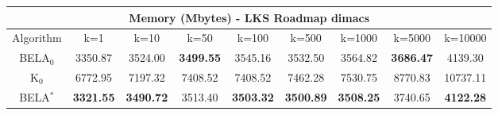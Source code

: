 \begin{tabular}{c|cccccccc}\toprule
\multicolumn{9}{c}{Memory (Mbytes) - LKS Roadmap dimacs}\\ \midrule
Algorithm & k=1 & k=10 & k=50 & k=100 & k=500 & k=1000 & k=5000 & k=10000 \\ \midrule
BELA$_0$ & 3350.87 & 3524.00 & \textbf{3499.55} & 3545.16 & 3532.50 & 3564.82 & \textbf{3686.47} & 4139.30 \\
K$_0$ & 6772.95 & 7197.32 & 7408.52 & 7408.52 & 7462.28 & 7530.75 & 8770.83 & 10737.11 \\
BELA$^*$ & \textbf{3321.55} & \textbf{3490.72} & 3513.40 & \textbf{3503.32} & \textbf{3500.89} & \textbf{3508.25} & 3740.65 & \textbf{4122.28} \\ \bottomrule 
\end{tabular}
